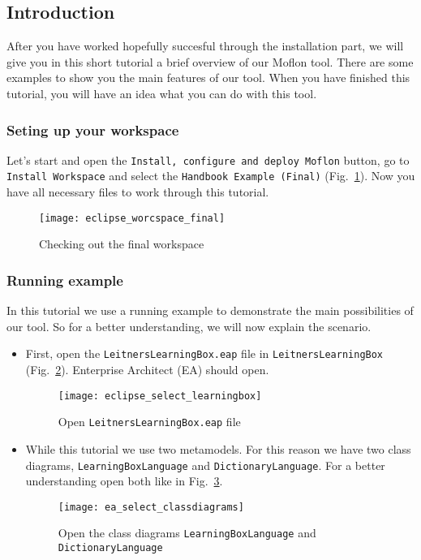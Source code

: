 \subsection{Introduction}
After you have worked hopefully succesful through the installation part, we will give you in this short tutorial a brief overview of our Moflon tool. There are some examples to show you the main features of our tool. When you have finished this tutorial, you will have an idea what you can do with this tool.

\subsubsection{Seting up your workspace}
Let's start and open the \texttt{Install, configure and deploy Moflon} button, go to \texttt{Install Workspace} and select the \texttt{Handbook Example (Final)} (Fig.~\ref{demo_workspace}). Now you have all necessary files to work through this tutorial.

\begin{figure}[htbp]
	\centering
  \texttt{[image: eclipse\_worcspace\_final]}
	\caption{Checking out the final workspace} 
	\label{demo_workspace} 
\end{figure}

\subsubsection{Running example}
In this tutorial we use a running example to demonstrate the main possibilities of our tool. So for a better understanding, we will now explain the scenario.
\begin{itemize}
\item First, open the \texttt{Leitners\-Learning\-Box.eap} file in \texttt{Leitners\-Learning\-Box} (Fig.~\ref{eclipse_open_eap}). Enterprise Architect (EA) should open.

\begin{figure}[htbp]
	\centering
  \texttt{[image: eclipse\_select\_learningbox]}
	\caption{Open \texttt{Leitners\-Learning\-Box.eap} file} 
	\label{eclipse_open_eap} 
\end{figure}

\item While this tutorial we use two metamodels. For this reason we have two class diagrams, \texttt{LearningBoxLanguage} and \texttt{DictionaryLanguage}. For a better understanding open both like in Fig.~\ref{ea_select_classdiagrams}.

  \begin{figure}[htbp]
	\centering
  \texttt{[image: ea\_select\_classdiagrams]}
	\caption{Open the class diagrams \texttt{Learning\-Box\-Language} and \texttt{Dictionary\-Language}} 
	\label{ea_select_classdiagrams} 
\end{figure}

\end{itemize}

